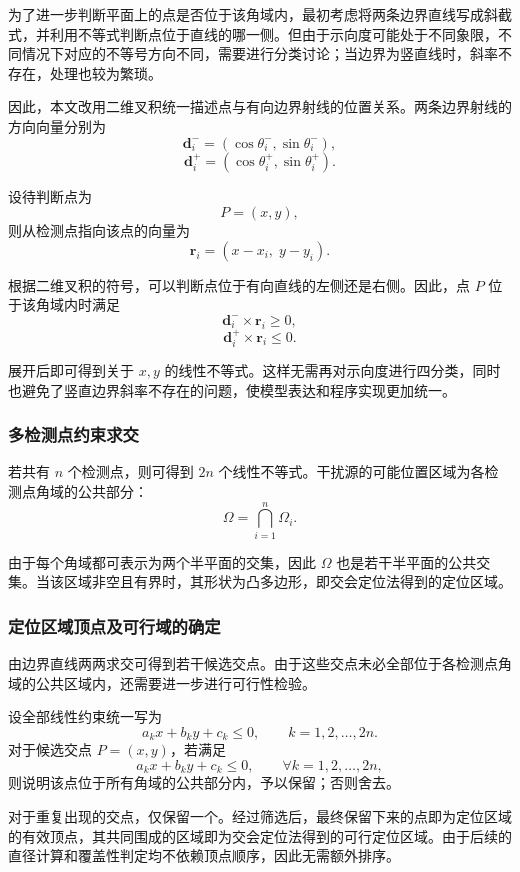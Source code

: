 \documentclass[withoutpreface,bwprint]{cumcmthesis}
\begin{document}
为了进一步判断平面上的点是否位于该角域内，最初考虑将两条边界直线写成斜截式，并利用不等式判断点位于直线的哪一侧。但由于示向度可能处于不同象限，不同情况下对应的不等号方向不同，需要进行分类讨论；当边界为竖直线时，斜率不存在，处理也较为繁琐。

因此，本文改用二维叉积统一描述点与有向边界射线的位置关系。两条边界射线的方向向量分别为
\[
\mathbf{d}_i^-=
\left(\cos\theta_i^-,\sin\theta_i^-\right),
\]
\[
\mathbf{d}_i^+=
\left(\cos\theta_i^+,\sin\theta_i^+\right).
\]

设待判断点为
\[
P=(x,y),
\]
则从检测点指向该点的向量为
\[
\mathbf{r}_i=
(x-x_i,\;y-y_i).
\]

根据二维叉积的符号，可以判断点位于有向直线的左侧还是右侧。因此，点 $P$ 位于该角域内时满足
\[
\mathbf{d}_i^- \times \mathbf{r}_i \geq 0,
\]
\[
\mathbf{d}_i^+ \times \mathbf{r}_i \leq 0.
\]

展开后即可得到关于 $x,y$ 的线性不等式。这样无需再对示向度进行四分类，同时也避免了竖直边界斜率不存在的问题，使模型表达和程序实现更加统一。

\subsubsection{多检测点约束求交}

若共有 $n$ 个检测点，则可得到 $2n$ 个线性不等式。干扰源的可能位置区域为各检测点角域的公共部分：
\[
\Omega=\bigcap_{i=1}^{n}\Omega_i.
\]

由于每个角域都可表示为两个半平面的交集，因此 $\Omega$ 也是若干半平面的公共交集。当该区域非空且有界时，其形状为凸多边形，即交会定位法得到的定位区域。





\subsubsection{定位区域顶点及可行域的确定}

由边界直线两两求交可得到若干候选交点。由于这些交点未必全部位于各检测点角域的公共区域内，还需要进一步进行可行性检验。

设全部线性约束统一写为
\[
a_kx+b_ky+c_k\leq 0,
\qquad k=1,2,\ldots,2n.
\]
对于候选交点 $P=(x,y)$，若满足
\[
a_kx+b_ky+c_k\leq 0,
\qquad \forall k=1,2,\ldots,2n,
\]
则说明该点位于所有角域的公共部分内，予以保留；否则舍去。

对于重复出现的交点，仅保留一个。经过筛选后，最终保留下来的点即为定位区域的有效顶点，其共同围成的区域即为交会定位法得到的可行定位区域。由于后续的直径计算和覆盖性判定均不依赖顶点顺序，因此无需额外排序。
\end{document}
